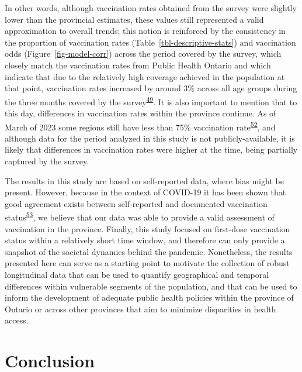 \documentclass[
  letterpaper,
  DIV=11,
  numbers=noendperiod]{scrartcl}
\begin{document}
In other words, although vaccination rates obtained from the survey were
slightly lower than the provincial estimates, these values still
represented a valid approximation to overall trends; this notion is
reinforced by the consistency in the proportion of vaccination rates
(Table~\ref{tbl-descriptive-stats}) and vaccination odds
(Figure~\ref{fig-model-corr}) across the period covered by the survey,
which closely match the vaccination rates from Public Health Ontario and
which indicate that due to the relatively high coverage achieved in the
population at that point, vaccination rates increased by around 3\%
across all age groups during the three months covered by the
survey\textsuperscript{\protect\hyperlink{ref-ontario-covid}{49}}. It is
also important to mention that to this day, differences in vaccination
rates within the province continue. As of March of 2023 some regions
still have less than 75\% vaccination
rate\textsuperscript{\protect\hyperlink{ref-ontario-covid-map}{52}}, and
although data for the period analyzed in this study is not
publicly-available, it is likely that differences in vaccination rates
were higher at the time, being partially captured by the survey.

The results in this study are based on self-reported data, where bias
might be present. However, because in the context of COVID-19 it has
been shown that good agreement exists between self-reported and
documented vaccination
status\textsuperscript{\protect\hyperlink{ref-stephenson2022}{53}}, we
believe that our data was able to provide a valid assessment of
vaccination in the province. Finally, this study focused on first-dose
vaccination status within a relatively short time window, and therefore
can only provide a snapshot of the societal dynamics behind the
pandemic. Nonetheless, the results presented here can serve as a
starting point to motivate the collection of robust longitudinal data
that can be used to quantify geographical and temporal differences
within vulnerable segments of the population, and that can be used to
inform the development of adequate public health policies within the
province of Ontario or across other provinces that aim to minimize
disparities in health access.

\hypertarget{conclusion}{%
\section{Conclusion}\label{conclusion}}
\end{document}
